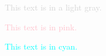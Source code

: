 \documentclass{article}
\begin{document}
\textcolor{lightGray}{This text is in a light gray.}

\textcolor{pink}{This text is in pink.}

\textcolor{cyan}{This text is in cyan.}
	
\end{document}
